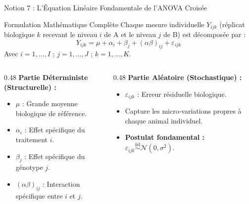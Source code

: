 \documentclass[aspectratio=169,10pt]{beamer}
\begin{document}
\begin{frame}{Notion 7 : L'Équation Linéaire Fondamentale de l'ANOVA Croisée}
  \begin{conceptbox}{Formulation Mathématique Complète}
    Chaque mesure individuelle $Y_{ijk}$ (réplicat biologique $k$ recevant le niveau $i$ de A et le niveau $j$ de B) est décomposée par :
    \begin{equation*}
      Y_{ijk} = \mu + \alpha_i + \beta_j + (\alpha\beta)_{ij} + \varepsilon_{ijk}
    \end{equation*}
    Avec $i = 1, \dots, I$ ; $j = 1, \dots, J$ ; $k = 1, \dots, K$.
  \end{conceptbox}

  \begin{columns}[onlytextwidth, T]
    \begin{column}{0.48\linewidth}
      \textbf{\color{BioNavy}Partie Déterministe (Structurelle) :}
      \begin{itemize}
        \item $\mu$ : Grande moyenne biologique de référence.
        \item $\alpha_i$ : Effet spécifique du traitement $i$.
        \item $\beta_j$ : Effet spécifique du génotype $j$.
        \item $(\alpha\beta)_{ij}$ : Interaction spécifique entre $i$ et $j$.
      \end{itemize}
    \end{column}
    \begin{column}{0.48\linewidth}
      \textbf{\color{BioTeal}Partie Aléatoire (Stochastique) :}
      \begin{itemize}
        \item $\varepsilon_{ijk}$ : Erreur résiduelle biologique.
        \item Capture les micro-variations propres à chaque animal individuel.
        \item \textbf{Postulat fondamental :} $\varepsilon_{ijk} \overset{\text{iid}}{\sim} \mathcal{N}(0, \sigma^2)$.
      \end{itemize}
    \end{column}
  \end{columns}
\end{frame}
\end{document}
